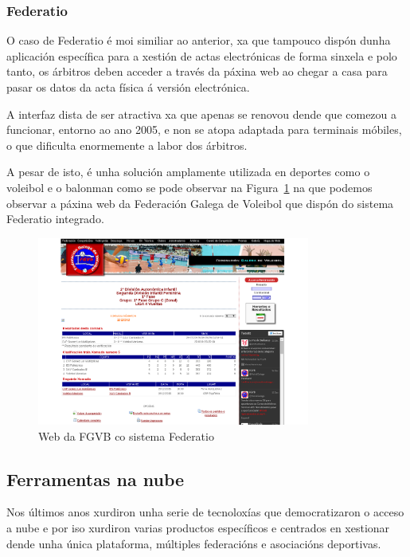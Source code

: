     \subsubsection{Federatio}

    O caso de Federatio é moi similiar ao anterior, xa que tampouco dispón 
dunha aplicación específica para a xestión de actas electrónicas de forma 
sinxela e polo tanto, os árbitros deben acceder a través da páxina web ao chegar 
a casa para pasar os datos da acta física á versión electrónica.

    A interfaz dista de ser atractiva xa que apenas se renovou dende que comezou a 
funcionar, entorno ao ano 2005, e non se atopa adaptada para terminais móbiles, 
o que dificulta enormemente a labor dos árbitros.

    A pesar de isto, é unha solución amplamente utilizada en deportes como o 
voleibol e o balonman como se pode observar na Figura~\ref{fig:img:federatio} 
na que podemos observar a páxina web da Federación Galega de Voleibol que 
dispón do sistema Federatio integrado.

      \begin{figure}[h!]
	\begin{center}
	  \includegraphics[width=0.8\textwidth]{./img/federatio-app.png}
	  \caption{Web da FGVB co sistema Federatio}
	  \label{fig:img:federatio}
	\end{center}
      \end{figure}

\clearpage


  \subsection{Ferramentas na nube}

  Nos últimos anos xurdiron unha serie de tecnoloxías que democratizaron o 
acceso a nube e por iso xurdiron varias productos específicos e centrados en 
xestionar dende unha única plataforma, múltiples federacións e asociacións 
deportivas.

